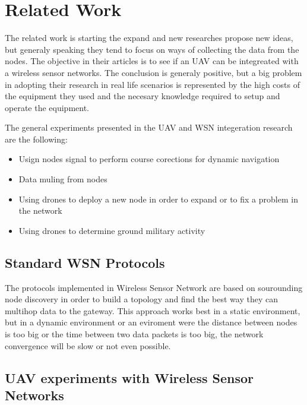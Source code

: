 \normalfont\normalsize
\chapter{Related Work}
\label{chap:related}

The related work is starting the expand and new researches propose new ideas, but generaly speaking they tend to focus on ways of collecting the data from the nodes. The objective in their articles is to see if an UAV can be integreated with a wireless sensor networks. The conclusion is generaly positive, but a big problem in adopting their research in real life scenarios is represented by the high costs of the equipment they used and the necesary knowledge required to setup and operate the equipment.

The general experiments presented in the UAV and WSN integeration research are the following:

\begin{itemize}

\item Usign nodes signal to perform course corections for dynamic navigation
\item Data muling from nodes 
\item Using drones to deploy a new node in order to expand or to fix a problem in the network
\item Using drones to determine ground military activity \cite{akyildiz2002wireless}

\end{itemize}


\section{Standard WSN Protocols}

The protocols implemented in Wireless Sensor Network are based on sourounding node discovery in order to build a topology and find the best way they can multihop data to the gateway. This approach works best in a static environment, but in a dynamic environment or an eviroment were the distance between nodes is too big or the time between two data packets is too big, the network convergence will be slow or not even possible.

\section{UAV experiments with Wireless Sensor Networks} \cite{teh2008experiments} 

